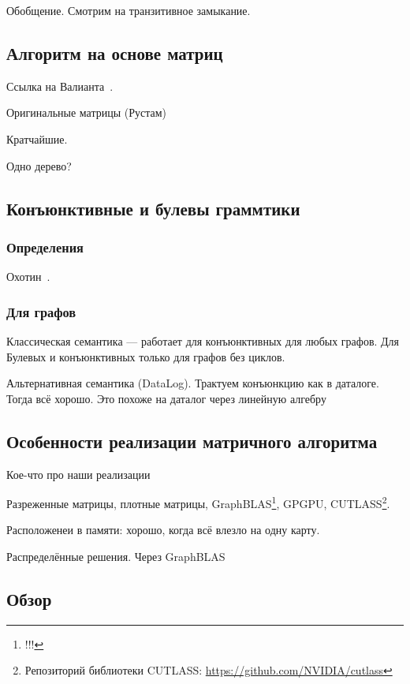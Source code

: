 Обобщение.
Смотрим на транзитивное замыкание.

\subsection{Алгоритм на основе матриц}

Ссылка на Валианта~\cite{!!!}.

Оригинальные матрицы (Рустам)~\cite{Azimov:2018:CPQ:3210259.3210264}

Кратчайшие.

Одно дерево?

\subsection{Конъюнктивные и булевы граммтики}

\subsubsection{Определения}

Охотин~\cite{!!!}.

\subsubsection{Для графов}

Классическая семантика --- работает для конъюнктивных для любых графов.
Для Булевых и конъюнктивных только для графов без циклов.

Альтернативная семантика (DataLog).
Трактуем конъюнкцию как в даталоге. Тогда всё хорошо.
Это похоже на даталог через линейную алгебру~\cite{!!!}

\subsection{Особенности реализации матричного алгоритма}

Кое-что про наши реализации~\cite{Mishin:2019:ECP:3327964.3328503}

Разреженные матрицы, плотные матрицы, GraphBLAS\footnote{!!!}, GPGPU, CUTLASS\footnote{Репозиторий библиотеки CUTLASS: \url{https://github.com/NVIDIA/cutlass}}.

Расположенеи в памяти: хорошо, когда всё влезло на одну карту.

Распределённые решения.
Через GraphBLAS

\subsection{Обзор}

